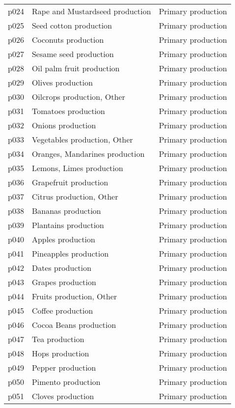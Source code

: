 \documentclass[]{article}
\begin{document}
\begin{longtable}[t]{lll}
p024 & Rape and Mustardseed production & Primary production\\
p025 & Seed cotton production & Primary production\\
\addlinespace
p026 & Coconuts production & Primary production\\
p027 & Sesame seed production & Primary production\\
p028 & Oil palm fruit production & Primary production\\
p029 & Olives production & Primary production\\
p030 & Oilcrops production, Other & Primary production\\
\addlinespace
p031 & Tomatoes production & Primary production\\
p032 & Onions production & Primary production\\
p033 & Vegetables production, Other & Primary production\\
p034 & Oranges, Mandarines production & Primary production\\
p035 & Lemons, Limes production & Primary production\\
\addlinespace
p036 & Grapefruit production & Primary production\\
p037 & Citrus production, Other & Primary production\\
p038 & Bananas production & Primary production\\
p039 & Plantains production & Primary production\\
p040 & Apples production & Primary production\\
\addlinespace
p041 & Pineapples production & Primary production\\
p042 & Dates production & Primary production\\
p043 & Grapes production & Primary production\\
p044 & Fruits production, Other & Primary production\\
p045 & Coffee production & Primary production\\
\addlinespace
p046 & Cocoa Beans production & Primary production\\
p047 & Tea production & Primary production\\
p048 & Hops production & Primary production\\
p049 & Pepper production & Primary production\\
p050 & Pimento production & Primary production\\
\addlinespace
p051 & Cloves production & Primary production\\

\end{longtable}
\end{document}
